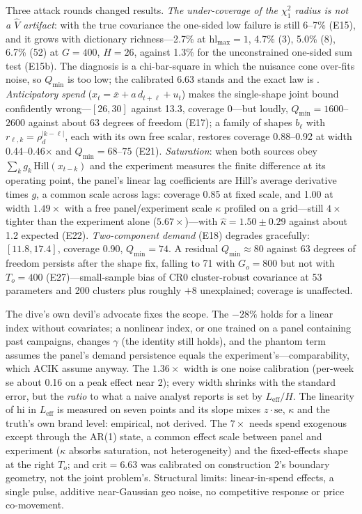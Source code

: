 Three attack rounds changed results. \emph{The under-coverage of the $\chi^2_1$ radius is not a $\hat V$ artifact}: with the true covariance the one-sided low failure is still 6--7\% (E15), and it grows with dictionary richness---2.7\% at $\mathrm{hl}_{\max} = 1$, 4.7\% (3), 5.0\% (8), 6.7\% (52) at $G = 400$, $H = 26$, against 1.3\% for the unconstrained one-sided sum test (E15b). The diagnosis is a chi-bar-square in which the nuisance cone over-fits noise, so $Q_{\min}$ is too low; the calibrated 6.63 stands and the exact law is . \emph{Anticipatory spend} ($x_t = \bar x + a\,d_{t+\ell} + u_t$) makes the single-shape joint bound confidently wrong---$[26, 30]$ against 13.3, coverage 0---but loudly, $Q_{\min} = 1600$--$2600$ against about 63 degrees of freedom (E17); a family of shapes $b_\ell$ with $r_{\ell,k} = \rho_d^{|k-\ell|}$, each with its own free scalar, restores coverage 0.88--0.92 at width 0.44--0.46$\times$ and $Q_{\min} = 68$--$75$ (E21). \emph{Saturation}: when both sources obey $\sum_k g_k\,\mathrm{Hill}(x_{t-k})$ and the experiment measures the finite difference at its operating point, the panel's linear lag coefficients are Hill's average derivative times $g$, a common scale across lags: coverage 0.85 at fixed scale, and 1.00 at width $1.49\times$ with a free panel/experiment scale $\kappa$ profiled on a grid---still $4\times$ tighter than the experiment alone ($5.67\times$)---with $\hat\kappa = 1.50 \pm 0.29$ against about 1.2 expected (E22). \emph{Two-component demand} (E18) degrades gracefully: $[11.8, 17.4]$, coverage 0.90, $Q_{\min} = 74$. A residual $Q_{\min} \approx 80$ against 63 degrees of freedom persists after the shape fix, falling to 71 with $G_o = 800$ but not with $T_o = 400$ (E27)---small-sample bias of CR0 cluster-robust covariance at 53 parameters and 200 clusters plus roughly $+8$ unexplained; coverage is unaffected.

The dive's own devil's advocate fixes the scope. The $-28\%$ holds for a linear index without covariates; a nonlinear index, or one trained on a panel containing past campaigns, changes $\gamma$ (the identity still holds), and the phantom term assumes the panel's demand persistence equals the experiment's---comparability, which ACIK assume anyway. The $1.36\times$ width is one noise calibration (per-week se about 0.16 on a peak effect near 2); every width shrinks with the standard error, but the \emph{ratio} to what a naive analyst reports is set by $L_{\mathrm{eff}}/H$. The linearity of $\mathrm{hi}$ in $L_{\mathrm{eff}}$ is measured on seven points and its slope mixes $z\cdot\mathrm{se}$, $\kappa$ and the truth's own brand level: empirical, not derived. The $7\times$ needs spend exogenous except through the AR(1) state, a common effect scale between panel and experiment ($\kappa$ absorbs saturation, not heterogeneity) and the fixed-effects shape at the right $T_o$; and $\mathrm{crit} = 6.63$ was calibrated on construction 2's boundary geometry, not the joint problem's. Structural limits: linear-in-spend effects, a single pulse, additive near-Gaussian geo noise, no competitive response or price co-movement.

